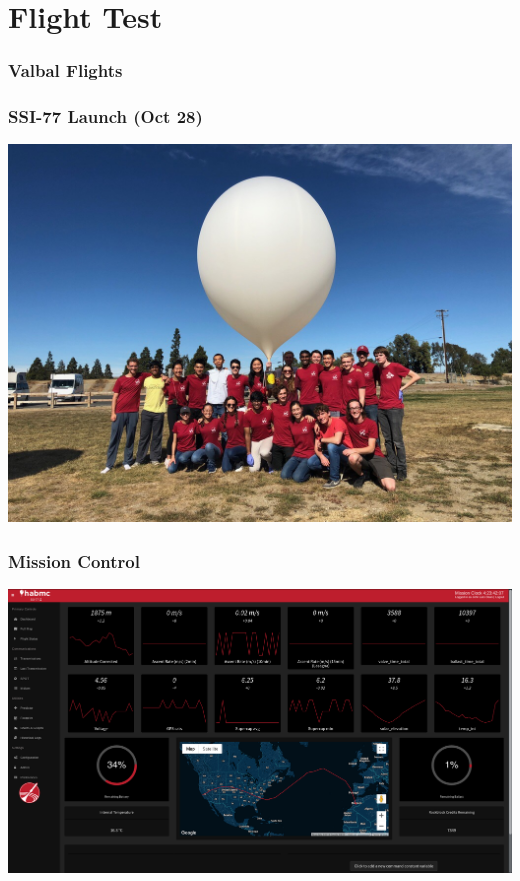 \documentclass[10pt,mathserif]{beamer}
\begin{document}
\section{Flight Test}

\begin{frame}
\frametitle{Valbal Flights}
\end{frame}

\begin{frame}
\frametitle{SSI-77 Launch (Oct 28)}
\includegraphics[width=1\linewidth,trim={0 2cm 0 2cm},clip]{launch.jpg}
\end{frame}

\begin{frame}
\frametitle{Mission Control}
\hspace*{-1cm}\includegraphics[width=1.2\linewidth,trim={0 0cm 0 0cm},clip]{habmc.png}
\end{frame}
\end{document}
